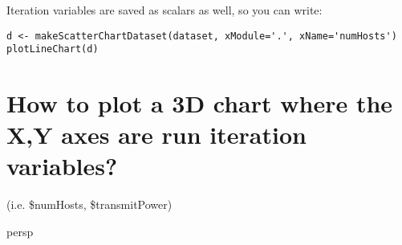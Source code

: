 Iteration variables are saved as scalars as well, so you can write:

\begin{verbatim}
d <- makeScatterChartDataset(dataset, xModule='.', xName='numHosts')
plotLineChart(d)
\end{verbatim}

\section{How to plot a 3D chart where the X,Y axes are run iteration variables?}

(i.e. \$numHosts, \$transmitPower)

persp

